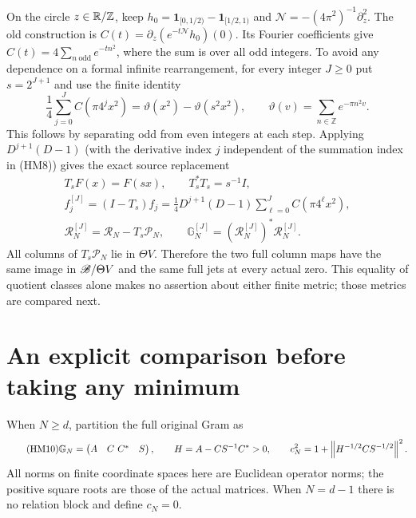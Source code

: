 \documentclass[11pt]{article}
\begin{document}
On the circle $z\in\mathbb R/\mathbb Z$, keep
$h_0=\mathbf1_{[0,1/2)}-\mathbf1_{[1/2,1)}$ and
$\mathcal N=-(4\pi^2)^{-1}\partial_z^2$. The old construction
\cite{hm2:oldcircle} is $C(t)=\partial_z(e^{-t\mathcal N}h_0)(0)$.
Its Fourier coefficients give $C(t)=4\sum_{n\ {\mathrm{odd}}}e^{-tn^2}$,
where the sum is over all odd integers. To avoid any dependence on a
formal infinite rearrangement, for every integer $J\ge0$ put
$s=2^{J+1}$ and use the finite identity
\begin{equation}\tag{HM8}
 \frac14\sum_{j=0}^J C(\pi4^jx^2)
  =\vartheta(x^2)-\vartheta(s^2x^2),\qquad
 \vartheta(v)=\sum_{n\in\mathbb Z}e^{-\pi n^2v}.
\end{equation}
This follows by separating odd from even integers at each step.
Applying $D^{j+1}(D-1)$ (with the derivative index $j$ independent of
the summation index in (HM8)) gives the exact source replacement
\begin{equation}\tag{HM9}
 \begin{gathered}
 T_sF(x)=F(sx),\qquad T_s^*T_s=s^{-1}I,\\
 f_j^{[J]}=(I-T_s)f_j
   =\frac14D^{j+1}(D-1)\sum_{\ell=0}^J C(\pi4^\ell x^2),\\
 \mathcal R_N^{[J]}=\mathcal R_N-T_s\mathcal P_N,
 \qquad \mathbb G_N^{[J]}=(\mathcal R_N^{[J]})^*\mathcal R_N^{[J]}.
 \end{gathered}
\end{equation}
All columns of $T_s\mathcal P_N$ lie in $\Theta V$. Therefore the
two full column maps have the same image in $\mathscr B/\Theta V$ and the
same full jets at every actual zero. This equality of quotient classes
alone makes no assertion about either finite metric; those metrics
are compared next.

\section{An explicit comparison before taking any minimum}
When $N\ge d$, partition the full original Gram as
\begin{equation}\tag{HM10}
 \mathbb G_N=\begin{pmatrix}A&C\ C^*&S\end{pmatrix},\qquad
 H=A-CS^{-1}C^*>0,
 \qquad
 c_N^2=1+\left\lVert H^{-1/2}CS^{-1/2}\right\rVert^2.
\end{equation}
All norms on finite coordinate spaces here are Euclidean operator norms;
the positive square roots are those of the actual matrices. When $N=d-1$
there is no relation block and define $c_N=0$.
\end{document}
